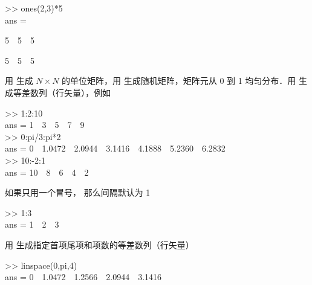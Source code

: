 \begin{Command}
>> ones(2,3)*5 \\
ans = \par
5\ \ 5\ \ 5 \par
5\ \ 5\ \ 5
\end{Command}
用  生成 $N\times N$ 的单位矩阵，用  生成随机矩阵，矩阵元从 0 到 1 均匀分布．用  生成等差数列（行矢量），例如
\begin{Command}
>> 1:2:10 \\
ans = 1\ \ 3\ \ 5\ \ 7\ \ 9 \\
>> 0:pi/3:pi*2 \\
ans = 0\ \ 1.0472\ \ 2.0944\ \ 3.1416\ \ 4.1888\ \ 5.2360\ \ 6.2832 \\
>> 10:-2:1 \\
ans = 10\ \ 8\ \ 6\ \ 4\ \ 2
\end{Command}
如果只用一个冒号， 那么间隔默认为 1
\begin{Command}
>> 1:3 \\
ans = 1\ \ 2\ \ 3
\end{Command}
用  生成指定首项尾项和项数的等差数列（行矢量）
\begin{Command}
>> linspace(0,pi,4) \\
ans = 0\ \ 1.0472\ \ 1.2566\ \ 2.0944\ \ 3.1416
\end{Command}

